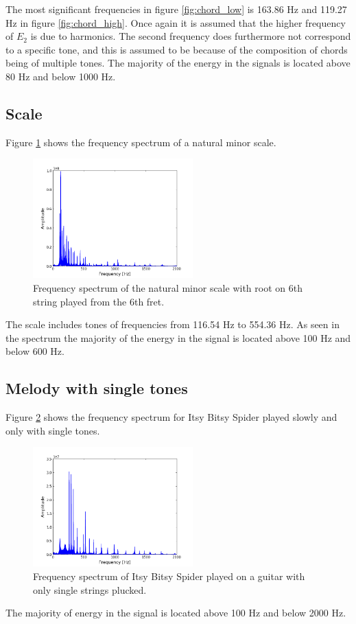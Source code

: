The most significant frequencies in figure \ref{fig:chord_low} is 163.86 Hz and 119.27 Hz in figure \ref{fig:chord_high}. Once again it is assumed that the higher frequency of $E_2$ is due to harmonics. The second frequency does furthermore not correspond to a specific tone, and this is assumed to be because of the composition of chords being of multiple tones. The majority of the energy in the signals is located above 80 Hz and below 1000 Hz.
\newpage
\subsection{Scale}
Figure \ref{fig:scale_fast} shows the frequency spectrum of a natural minor scale.
\begin{figure}[H]
\centering
\includegraphics[width=0.55\textwidth]{figures/freqanal/scale_fast.png}
\caption{Frequency spectrum of the natural minor scale with root on 6th string played from the 6th fret.}
\label{fig:scale_fast}
\end{figure}
The scale includes tones of frequencies from 116.54 Hz to 554.36 Hz. As seen in the spectrum the majority of the energy in the signal is located above 100 Hz and below 600 Hz.

\subsection{Melody with single tones}
Figure \ref{fig:melody_single} shows the frequency spectrum for Itsy Bitsy Spider played slowly and only with single tones.
\begin{figure}[H]
\centering
\includegraphics[width=0.55\textwidth]{figures/freqanal/melody_single.png}
\caption{Frequency spectrum of Itsy Bitsy Spider played on a guitar with only single strings plucked.}
\label{fig:melody_single}
\end{figure}
The majority of energy in the signal is located above 100 Hz and below 2000 Hz.


